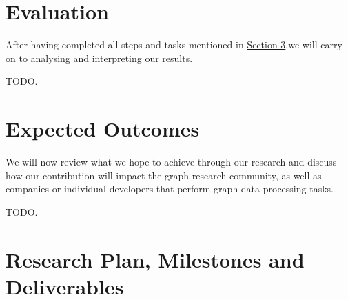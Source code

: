 \documentclass[a4paper,11pt]{article}
\begin{document}
\section{Evaluation} \label{evaluation}

\par After having completed all steps and tasks mentioned in \hyperref[methodology]{Section 3},we will carry on to analysing and interpreting our results.

\medskip

\par TODO.


\section{Expected Outcomes} \label{outcomes}

\par We will now review what we hope to achieve through our research and discuss how our contribution will impact the graph research community, as well as companies or individual developers that perform graph data processing tasks.

\medskip

\par TODO.




\section{Research Plan, Milestones and Deliverables} \label{milestones}
\end{document}
